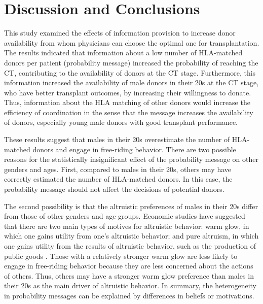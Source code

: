 \documentclass[12pt, a4paper]{article}
\begin{document}
\hypertarget{conclusion}{%
\section{Discussion and Conclusions}\label{conclusion}}

This study examined the effects of information provision to increase donor availability from whom physicians can choose the optimal one for transplantation. The results indicated that information about a low number of HLA-matched donors per patient (probability message) increased the probability of reaching the CT, contributing to the availability of donors at the CT stage. Furthermore, this information increased the availability of male donors in their 20s at the CT stage, who have better transplant outcomes, by increasing their willingness to donate. Thus, information about the HLA matching of other donors would increase the efficiency of coordination in the sense that the message increases the availability of donors, especially young male donors with good transplant performance.

These results suggest that males in their 20s overestimate the number of HLA-matched donors and engage in free-riding behavior. There are two possible reasons for the statistically insignificant effect of the probability message on other genders and ages. First, compared to males in their 20s, others may have correctly estimated the number of HLA-matched donors. In this case, the probability message should not affect the decisions of potential donors.

The second possibility is that the altruistic preferences of males in their 20s differ from those of other genders and age groups. Economic studies have suggested that there are two main types of motives for altruistic behavior: warm glow, in which one gains utility from one's altruistic behavior; and pure altruism, in which one gains utility from the results of altruistic behavior, such as the production of public goods \citep[e.g.,][]{Andreoni1990}. Those with a relatively stronger warm glow are less likely to engage in free-riding behavior because they are less concerned about the actions of others. Thus, others may have a stronger warm glow preference than males in their 20s as the main driver of altruistic behavior. In summary, the heterogeneity in probability messages can be explained by differences in beliefs or motivations.
\end{document}
